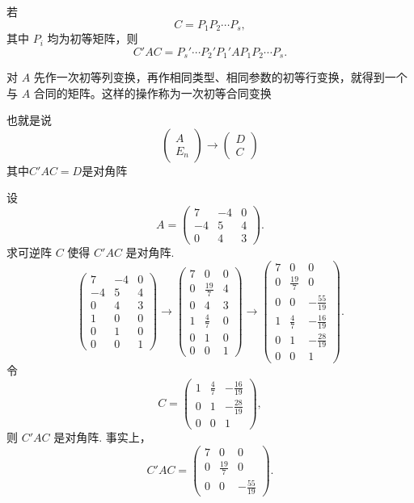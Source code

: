 若
\[
C=P_1P_2\cdots P_s,
\]
其中 $P_i$ 均为初等矩阵，则
\[
C'AC=P_s'\cdots P_2'P_1'AP_1P_2\cdots P_s.
\]
\begin{definition}
	对 $A$ 先作一次初等列变换，再作相同类型、相同参数的初等行变换，就得到一个与 $A$ 合同的矩阵。这样的操作称为一次初等合同变换
\end{definition}
也就是说\[\begin{pmatrix}
	A\\
	E_n
\end{pmatrix}\to \begin{pmatrix}
D\\
C
\end{pmatrix}\]
其中$C'AC=D$是对角阵
\begin{example}
	设
	\[
	A=\begin{pmatrix}
		7&-4&0\\
		-4&5&4\\
		0&4&3
	\end{pmatrix}.
	\]
	求可逆阵 $C$ 使得 $C'AC$ 是对角阵.
	\[
	\left(\begin{array}{ccc}
		7&-4&0\\
		-4&5&4\\
		0&4&3\\ \hline
		1&0&0\\
		0&1&0\\
		0&0&1
	\end{array}\right)
	\longrightarrow
	\left(\begin{array}{ccc}
		7&0&0\\
		0&\frac{19}{7}&4\\
		0&4&3\\ \hline
		1&\frac{4}{7}&0\\
		0&1&0\\
		0&0&1
	\end{array}\right)
	\longrightarrow
	\left(\begin{array}{ccc}
		7&0&0\\
		0&\frac{19}{7}&0\\
		0&0&-\frac{55}{19}\\ \hline
		1&\frac{4}{7}&-\frac{16}{19}\\
		0&1&-\frac{28}{19}\\
		0&0&1
	\end{array}\right).
	\]
	令
	\[
	C=\begin{pmatrix}
		1&\frac{4}{7}&-\frac{16}{19}\\
		0&1&-\frac{28}{19}\\
		0&0&1
	\end{pmatrix},
	\]
	则 $C'AC$ 是对角阵. 事实上，
	\[
	C'AC=\begin{pmatrix}
		7&0&0\\
		0&\frac{19}{7}&0\\
		0&0&-\frac{55}{19}
	\end{pmatrix}.
	\]
\end{example}


